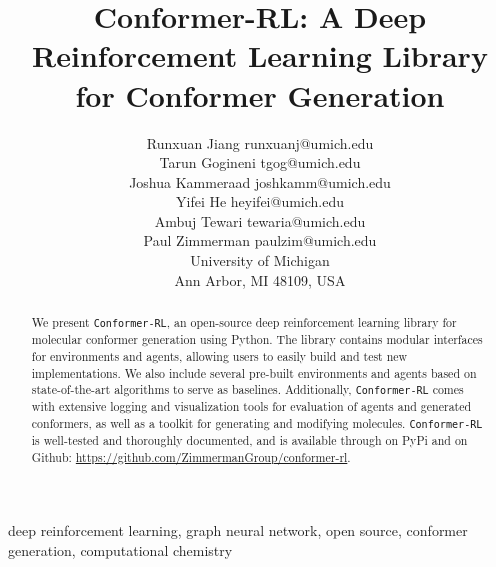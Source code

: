 \documentclass[twoside,11pt]{article}
\newcommand{\code}[1]{\texttt{#1}}
\newcommand{\titleofpaper}{Conformer-RL}
\newcommand{\genComment}[2]{\ifnum\comments=1{\color{#1}{\textsf{\footnotesize #2}}}\fi}
\newcommand{\ambuj}[1] {\genComment{red}{[AT: #1]}}
\begin{document}
\title{\titleofpaper: A Deep Reinforcement Learning Library for Conformer Generation}

\author{\name Runxuan Jiang \email runxuanj@umich.edu \\
       \name Tarun Gogineni \email tgog@umich.edu \\
       \name Joshua Kammeraad \email joshkamm@umich.edu\\
       \name  Yifei He \email heyifei@umich.edu \\
       \name Ambuj Tewari \email tewaria@umich.edu\\
       \name Paul Zimmerman \email paulzim@umich.edu\\
       \addr
       University of Michigan\\
       Ann Arbor, MI 48109, USA} 

\maketitle


\begin{abstract}%
  We present \code{\titleofpaper}, an open-source deep reinforcement learning library for molecular conformer generation using Python. The library contains modular interfaces for environments and agents, allowing users to easily build and test new implementations. We also include several pre-built environments and agents based on state-of-the-art algorithms to serve as baselines. Additionally, \code{\titleofpaper} comes with extensive logging and visualization tools for evaluation of agents and generated conformers, as well as a toolkit for generating and modifying molecules. \code{\titleofpaper} is well-tested and thoroughly documented, and is available through on PyPi and on Github: \url{https://github.com/ZimmermanGroup/conformer-rl}.
\end{abstract}

\begin{keywords}
  deep reinforcement learning, graph neural network, open source, conformer generation, computational chemistry
\end{keywords}

\end{document}
